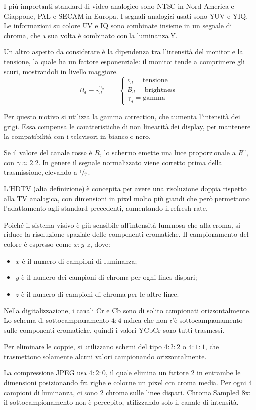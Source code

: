 I più importanti standard di video analogico sono NTSC in Nord America e Giappone, PAL e SECAM in Europa. I segnali analogici usati sono YUV e YIQ. Le informazioni su colore UV e IQ sono combinate insieme in un segnale di chroma, che a sua volta è combinato con la luminanza Y.

Un altro aspetto da considerare è la dipendenza tra l'intensità del monitor e la tensione, la quale ha un fattore esponenziale: il monitor tende a comprimere gli scuri, mostrandoli in livello maggiore.
$$B_d = v_d^{\gamma_d} \qquad \begin{cases}
v_d = \text{tensione} \\
B_d = \text{brightness} \\
\gamma_d = \text{gamma}
\end{cases}$$

Per questo motivo si utilizza la gamma correction, che aumenta l'intensità dei grigi. Essa compensa le caratteristiche di non linearità dei display, per mantenere la compatibilità con i televisori in bianco e nero.

Se il valore del canale rosso è $R$, lo schermo emette una luce proporzionale a $R^\gamma$, con $\gamma \approx 2.2$. In genere il segnale normalizzato viene corretto prima della trasmissione, elevando a $\nicefrac{1}{\gamma}$.

L'HDTV (alta definizione) è concepita per avere una risoluzione doppia rispetto alla TV analogica, con dimensioni in pixel molto più grandi che però permettono l'adattamento agli standard precedenti, aumentando il refresh rate. 

Poiché il sistema visivo è più sensibile all'intensità luminosa che alla croma, si riduce la risoluzione spaziale delle componenti cromatiche. Il campionamento del colore è espresso come $x : y : z$, dove:
\begin{itemize}
	\item $x$ è il numero di campioni di luminanza;
	\item $y$ è il numero dei campioni di chroma per ogni linea dispari;
	\item $z$ è il numero di campioni di chroma per le altre linee.
\end{itemize}

Nella digitalizzazione, i canali Cr e Cb sono di solito campionati orizzontalmente. Lo schema di sottocampionamento $4 : 4$ indica che non c'è sottocampionamento sulle componenti cromatiche, quindi i valori YCbCr sono tutti trasmessi. 

Per eliminare le coppie, si utilizzano schemi del tipo $4 : 2 : 2$ o $4 : 1 : 1$, che trasmettono solamente alcuni valori campionando orizzontalmente. 

La compressione JPEG usa $4 : 2 : 0$, il quale elimina un fattore 2 in entrambe le dimensioni posizionando fra righe e colonne un pixel con croma media. Per ogni 4 campioni di luminanza, ci sono 2 chroma sulle linee dispari. 
Chroma Sampled 8x: il sottocampionamento non è percepito, utilizzando solo il canale di intensità.





